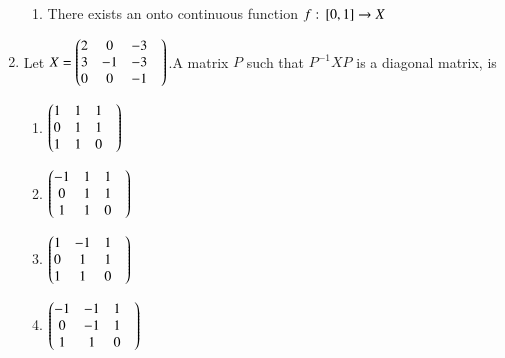 \documentclass[journal]{IEEEtran}
\begin{document}
\begin{enumerate}
\begin{enumerate}
        \item There exists an onto continuous function $f:{}\left[0,1\right]\rightarrow X$\\
    \end{enumerate}
    \item Let $X=\begin{pmatrix}2&0&-3&\\
                        3&-1&-3\\
                        0&0&-1\end{pmatrix}$.A matrix $P$ such that $P^{-1}XP$ is a diagonal matrix, is
    \begin{enumerate}
        \item $\begin{pmatrix}1&1&1&\\
                        0&1&1\\
                        1&1&0\end{pmatrix}$
        \item $\begin{pmatrix}-1&1&1&\\
                        0&1&1\\
                        1&1&0\end{pmatrix}$
        \item $\begin{pmatrix}1&-1&1&\\
                        0&1&1\\
                        1&1&0\end{pmatrix}$
        \item $\begin{pmatrix}-1&-1&1&\\
                        0&-1&1\\
                        1&1&0\end{pmatrix}$
    \end{enumerate}


    
\end{enumerate}
\end{document}
